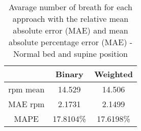 \begin{table}[H]

    \centering
    \begin{tabular}{|c|c|c|}
    \hline 
    & Binary  & Weighted  \\ 
    \hline 
    rpm mean & 14.529 &  14.506\\
    MAE rpm  & 2.1731  &  2.1499 \\ 
    MAPE  & 17.8104\%  & 17.6198\% \\ 
    \hline 
    \end{tabular}
    
    \caption{Avarage number of breath for each approach with the relative mean absolute error (MAE) and mean absolute percentage error (MAE) - Normal bed and supine position}
    \label{tab:SupineNormalStillMetrics}
\end{table}